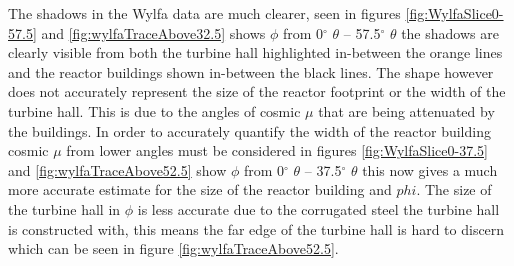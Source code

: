 The shadows in the Wylfa data are much clearer, seen in figures \ref{fig:WylfaSlice0-57.5} and \ref{fig:wylfaTraceAbove32.5} shows $\phi$ from 0$^{\circ}$ $\theta$ -- 57.5$^{\circ}$ $\theta$ the shadows are clearly visible from both the turbine hall highlighted in-between the orange lines and the reactor buildings shown in-between the black lines. The shape however does not accurately represent the size of the reactor footprint or the width of the turbine hall. This is due to the angles of cosmic $\mu$ that are being attenuated by the buildings. In order to accurately quantify the width of the reactor building cosmic $\mu$ from lower angles must be considered in figures \ref{fig:WylfaSlice0-37.5} and \ref{fig:wylfaTraceAbove52.5}  show $\phi$ from 0$^{\circ}$ $\theta$ -- 37.5$^{\circ}$ $\theta$ this now gives a much more accurate estimate for the size of the reactor building and $phi$. The size of the turbine hall in $\phi$ is less accurate due to the corrugated steel the turbine hall is constructed with, this means the far edge of the turbine hall is hard to discern which can be seen in figure \ref{fig:wylfaTraceAbove52.5}.

